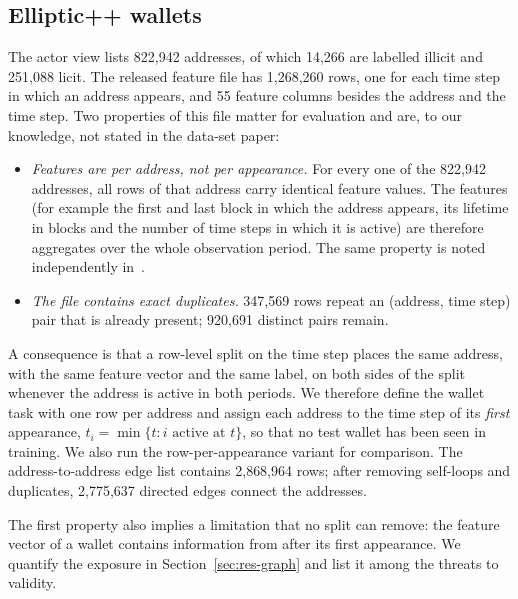 \subsection{Elliptic++ wallets}\label{sec:data-wallets}
The actor view lists 822,942 addresses, of which 14,266 are labelled illicit and 251,088 licit. The released feature file has 1,268,260 rows, one for each time step in which an address appears, and 55 feature columns besides the address and the time step. Two properties of this file matter for evaluation and are, to our knowledge, not stated in the data-set paper:
\begin{itemize}
\item \emph{Features are per address, not per appearance.} For every one of the 822,942 addresses, all rows of that address carry identical feature values. The features (for example the first and last block in which the address appears, its lifetime in blocks and the number of time steps in which it is active) are therefore aggregates over the whole observation period. The same property is noted independently in~\cite{malik2026}.
\item \emph{The file contains exact duplicates.} 347,569 rows repeat an (address, time step) pair that is already present; 920,691 distinct pairs remain.
\end{itemize}
A consequence is that a row-level split on the time step places the same address, with the same feature vector and the same label, on both sides of the split whenever the address is active in both periods. We therefore define the wallet task with one row per address and assign each address to the time step of its \emph{first} appearance, $t_i = \min\{t : i \text{ active at } t\}$, so that no test wallet has been seen in training. We also run the row-per-appearance variant for comparison. The address-to-address edge list contains 2,868,964 rows; after removing self-loops and duplicates, 2,775,637 directed edges connect the addresses.

The first property also implies a limitation that no split can remove: the feature vector of a wallet contains information from after its first appearance. We quantify the exposure in Section~\ref{sec:res-graph} and list it among the threats to validity.

